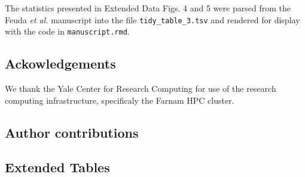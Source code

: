\documentclass[]{article}
\begin{document}
The statistics presented in Extended Data Figs. 4 and 5 were parsed from
the Feuda \emph{et al.} manuscript into the file
\texttt{tidy\_table\_3.tsv} and rendered for display with the code in
\texttt{manuscript.rmd}.

\hypertarget{ackowledgements}{%
\subsection{Ackowledgements}\label{ackowledgements}}

We thank the Yale Center for Research Computing for use of the research
computing infrastructure, specificaly the Farnam HPC cluster.

\hypertarget{author-contributions}{%
\subsection{Author contributions}\label{author-contributions}}

\hypertarget{extended-tables}{%
\subsection{Extended Tables}\label{extended-tables}}
\end{document}
